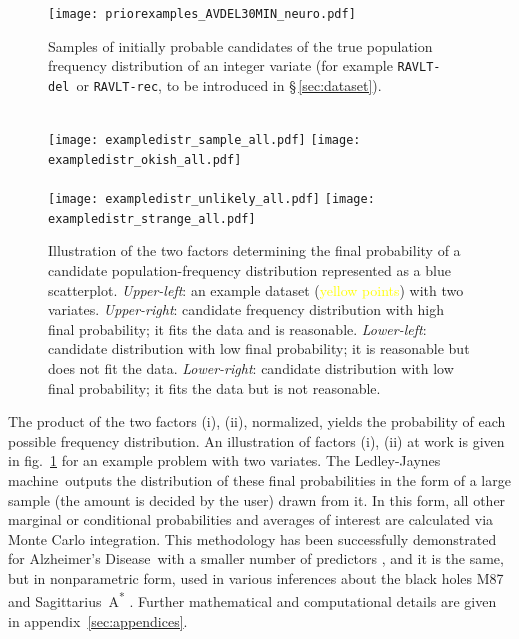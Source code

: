 \documentclass[utf8]{FrontiersinHarvard_mod} %
\newcommand*{\sect}{\S}%
\newcommand*{\fig}{fig.}%
\renewcommand*{\|}[1][]{\nonscript\:#1\vert\nonscript\:\mathopen{}}
\newcommand*{\ravltdel}{\texttt{RAVLT-del}}
\newcommand*{\ravltrec}{\texttt{RAVLT-rec}}
\newcommand*{\ad}{Alzheimer's Disease}
\newcommand*{\ljm}{Ledley-Jaynes machine}
\begin{document}
\begin{subfigure}[t]\setcounter{subfigure}{0}
  \centering%
  \begin{minipage}[c]{0.39\linewidth}\centering
    \texttt{[image: priorexamples\_AVDEL30MIN\_neuro.pdf]}
  \caption{Samples of initially probable candidates of the true population frequency distribution of an integer variate (for example \ravltdel\ or \ravltrec, to be introduced in \sect\,\ref{sec:dataset}).}\label{fig:prior_distribution}
  \end{minipage}\hfill
  \begin{minipage}[c]{0.59\linewidth}\centering%
%
\hfill%
%
\\[-1em]
\texttt{[image: exampledistr\_sample\_all.pdf]}%
\hfill%
\texttt{[image: exampledistr\_okish\_all.pdf]}%
\\
%
\hfill%
%
\\[-1em]
  \texttt{[image: exampledistr\_unlikely\_all.pdf]}
  \hfill
  \texttt{[image: exampledistr\_strange\_all.pdf]}
  \caption{Illustration of the two factors determining the final probability of a candidate population-frequency distribution represented as a \textcolor{bluepurple}{blue scatterplot}. \emph{Upper-left}: an example dataset (\textcolor{yellow}{yellow points}) with two variates. \emph{Upper-right}: candidate frequency distribution with high final probability; it fits the data and is reasonable. \emph{Lower-left}: candidate distribution with low final probability; it is reasonable but does not fit the data. \emph{Lower-right}: candidate distribution with low final probability; it fits the data but is not reasonable.}\label{fig:inferring_distribution}
  \end{minipage}
\end{subfigure}%


The product of the two factors (i), (ii), normalized, yields the probability of each possible frequency distribution. An illustration of factors (i), (ii) at work is given in \fig~\ref{fig:inferring_distribution} for an example problem with two variates. The \ljm\ outputs the distribution of these final probabilities in the form of a large sample (the amount is decided by the user) drawn from it. In this form, all other marginal or conditional probabilities and averages of interest are calculated via Monte Carlo integration. This methodology has been successfully demonstrated for \ad\ with a smaller number of predictors \citep{antonianovillalobosetal2014}, and it is the same, but in nonparametric form, used in various inferences about the black holes M87 and Sagittarius~A\textsuperscript{*} \citep{eht2019,eht2022}. Further mathematical and computational details are given in appendix~\ref{sec:appendices}.
\end{document}
